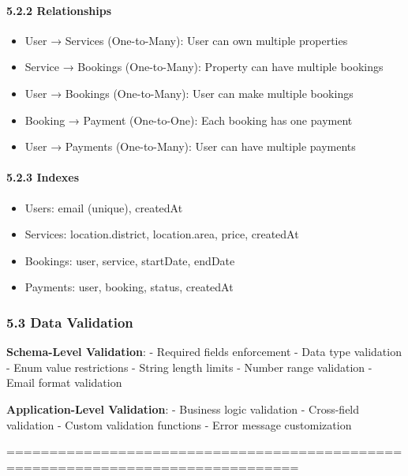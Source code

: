 \documentclass[12pt,a4paper]{article}
\begin{document}
\hypertarget{relationships}{%
\paragraph{5.2.2 Relationships}\label{relationships}}

\begin{itemize}
\tightlist
\item
  User → Services (One-to-Many): User can own multiple properties
\item
  Service → Bookings (One-to-Many): Property can have multiple bookings
\item
  User → Bookings (One-to-Many): User can make multiple bookings
\item
  Booking → Payment (One-to-One): Each booking has one payment
\item
  User → Payments (One-to-Many): User can have multiple payments
\end{itemize}

\hypertarget{indexes}{%
\paragraph{5.2.3 Indexes}\label{indexes}}

\begin{itemize}
\tightlist
\item
  Users: email (unique), createdAt
\item
  Services: location.district, location.area, price, createdAt
\item
  Bookings: user, service, startDate, endDate
\item
  Payments: user, booking, status, createdAt
\end{itemize}

\hypertarget{data-validation}{%
\subsubsection{5.3 Data Validation}\label{data-validation}}

\textbf{Schema-Level Validation}: - Required fields enforcement - Data
type validation - Enum value restrictions - String length limits -
Number range validation - Email format validation

\textbf{Application-Level Validation}: - Business logic validation -
Cross-field validation - Custom validation functions - Error message
customization

================================================================================
\end{document}
